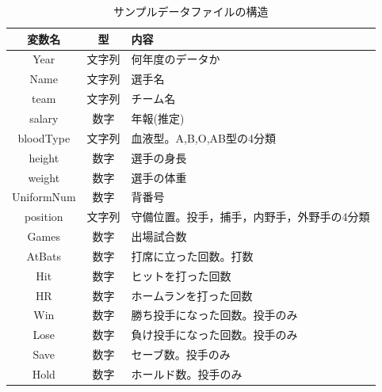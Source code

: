 \begin{table}[b]
	\begin{center}
		\caption{サンプルデータファイルの構造}
		\begin{tabular}{ccl}
			変数名        & 型   & 内容                     \\\hline
			Year       & 文字列 & 何年度のデータか               \\
			Name       & 文字列 & 選手名                    \\
			team       & 文字列 & チーム名                   \\
			salary     & 数字  & 年報(推定)                 \\
			bloodType  & 文字列 & 血液型。A,B,O,AB型の4分類      \\
			height     & 数字  & 選手の身長                  \\
			weight     & 数字  & 選手の体重                  \\
			UniformNum & 数字  & 背番号                    \\
			position   & 文字列 & 守備位置。投手，捕手，内野手，外野手の4分類 \\
			Games      & 数字  & 出場試合数                  \\
			AtBats     & 数字  & 打席に立った回数。打数            \\
			Hit        & 数字  & ヒットを打った回数              \\
			HR         & 数字  & ホームランを打った回数            \\
			Win        & 数字  & 勝ち投手になった回数。投手のみ        \\
			Lose       & 数字  & 負け投手になった回数。投手のみ        \\
			Save       & 数字  & セーブ数。投手のみ              \\
			Hold       & 数字  & ホールド数。投手のみ             \\\hline
		\end{tabular}
		\label{BaseballDecade}
	\end{center}
\end{table}
